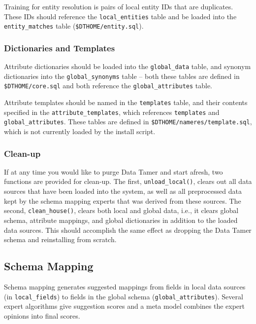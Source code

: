 \documentclass[12pt]{article}
\begin{document}
Training for entity resolution is pairs of local entity IDs that are duplicates.  These IDs should reference the \texttt{local\_entities} table and be loaded into the \texttt{entity\_matches} table (\texttt{\$DTHOME/entity.sql}).

\subsubsection{Dictionaries and Templates}

Attribute dictionaries should be loaded into the \texttt{global\_data} table, and synonym dictionaries into the \texttt{global\_synonyms} table -- both these tables are defined in \texttt{\$DTHOME/core.sql} and both reference the \texttt{global\_attributes} table.

Attribute templates should be named in the \texttt{templates} table, and their contents specified in the \texttt{attribute\_templates}, which references \texttt{templates} and \texttt{global\_attributes}.  These tables are defined in \texttt{\$DTHOME/nameres/template.sql}, which is not currently loaded by the install script.

\subsubsection{Clean-up}

If at any time you would like to purge Data Tamer and start afresh, two functions are provided for clean-up.  The first, \texttt{unload\_local()}, clears out all data sources that have been loaded into the system, as well as all preprocessed data kept by the schema mapping experts that was derived from these sources.  The second, \texttt{clean\_house()}, clears both local and global data, i.e., it clears global schema, attribute mappings, and global dictionaries in addition to the loaded data sources.  This should accomplish the same effect as dropping the Data Tamer schema and reinstalling from scratch.


\subsection{Schema Mapping}

Schema mapping generates suggested mappings from fields in local data sources (in \texttt{local\_fields}) to fields in the global schema (\texttt{global\_attributes}).  Several expert algorithms give suggestion scores and a meta model combines the expert opinions into final scores.
\end{document}
